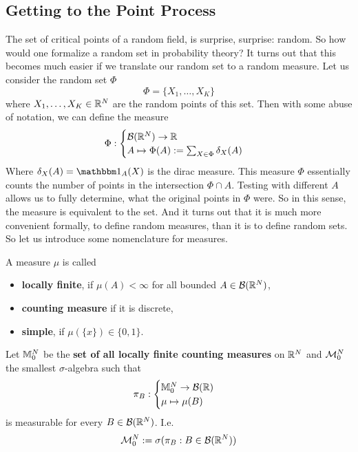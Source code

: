 \subsection{Getting to the Point Process}

The set of critical points of a random field, is surprise, surprise: random.
So how would one formalize a random set in probability theory? It turns
out that this becomes much easier if we translate our random set to a random
measure. Let us consider the random set \(\Phi\)
\[
	\Phi = \{ X_1, \dots, X_K\}
\]
where \(X_1,\dots, X_K\in\mathbb{R}^N\) are the random points of this set. Then with some
abuse of notation, we can define the measure
\[
	\Phi :
	\begin{cases}
		\mathcal{B}(\mathbb{R}^N) \to \mathbb{R} \\
		A \mapsto \Phi(A):= \sum_{X\in \Phi}\delta_X(A) 
	\end{cases}
\]
Where \(\delta_X(A)=\ind_A(X)\) is the dirac measure. This measure \(\Phi\)
essentially counts the number of points in the intersection \(\Phi\cap A\).
Testing with different \(A\) allows us to fully determine, what
the original points in \(\Phi\) were. So in this sense, the measure is
equivalent to the set. And it turns out that it is much more convenient
formally, to define random measures, than it is to define random sets.
So let us introduce some nomenclature for measures.

A measure \(\mu\) is called
\begin{itemize}
	\item \textbf{locally finite}, if \(\mu(A) < \infty\) for all bounded
	\(A\in\mathcal{B}(\mathbb{R}^N)\),
	\item \textbf{counting measure} if it is discrete,
	\item \textbf{simple}, if \(\mu(\{x\})\in\{0,1\}\).
\end{itemize}
Let \(\mathbb{M}^{N}_0\) be the \textbf{set of all locally finite counting measures}
on \(\mathbb{R}^N\) and \(\mathcal{M}^{N}_0\) the smallest \(\sigma\)-algebra
such that
\[
	\pi_B : \begin{cases}
		\mathbb{M}^{N}_0 \to \mathcal{B}(\mathbb{R})\\
		\mu \mapsto \mu(B)
	\end{cases}
\]
is measurable for every \(B\in\mathcal{B}(\mathbb{R}^N)\). I.e.
\[
	\mathcal{M}^{N}_0 := \sigma(\pi_B : B\in\mathcal{B}(\mathbb{R}^N))
\]

